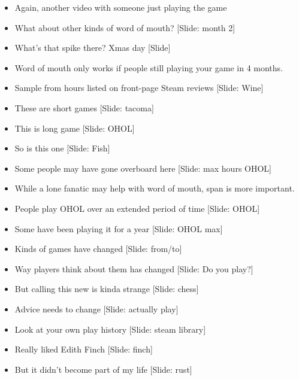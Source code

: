 \documentclass[12pt]{article}
\begin{document}
{\begin{itemize}
\item Again, another video with someone just playing the game

\item What about other kinds of word of mouth? [Slide:  month 2]

\item What's that spike there?  Xmas day [Slide]

\item Word of mouth only works if people still playing your game in 4 months.

\item Sample from hours listed on front-page Steam reviews [Slide: Wine]

\item These are short games [Slide: tacoma]

\item This is long game [Slide: OHOL]

\item So is this one [Slide: Fish]

\item Some people may have gone overboard here [Slide: max hours OHOL]

\item While a lone fanatic may help with word of mouth, span is more important.

\item People play OHOL over an extended period of time [Slide: OHOL]

\item Some have been playing it for a year [Slide: OHOL max]

\item Kinds of games have changed [Slide: from/to]

\item Way players think about them has changed [Slide:  Do you play?]

\item But calling this new is kinda strange [Slide:  chess]

\item Advice needs to change [Slide: actually play]

\item Look at your own play history [Slide: steam library]

\item Really liked Edith Finch [Slide: finch]

\item But it didn't become part of my life [Slide: rust]


\end{itemize}}
\end{document}
